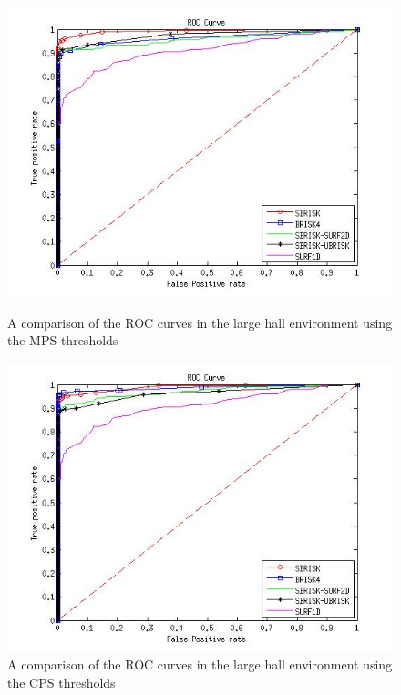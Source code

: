 \documentclass{article}
\begin{document}
\begin{figure}[h!]
\begin{minipage}[b]{0.5\linewidth}
\includegraphics[scale=0.4]{../Drawings/dataset3_ROC_General_KNN.jpg}
\caption{A comparison of the ROC curves in the large hall environment using the MPS thresholds}
\label{fig:compareKnnOffice3}
\end{minipage}
\hspace{0.5cm}
\begin{minipage}[b]{0.5\linewidth}
\includegraphics[scale=0.4]{../Drawings/dataset3_ROC_General_KNN_Consistent.jpg}
\caption{A comparison of the ROC curves in the large hall environment using the CPS thresholds}
\label{fig:compareKnnConsistentOffice3}
\end{minipage}

\end{figure}
\end{document}
